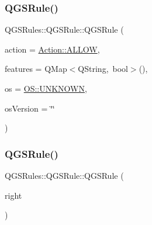 \subsubsection{\texorpdfstring{Q\+G\+S\+Rule()}{QGSRule()}\hspace{0.1cm}{\footnotesize\ttfamily [1/3]}}
{\footnotesize\ttfamily Q\+G\+S\+Rules\+::\+Q\+G\+S\+Rule\+::\+Q\+G\+S\+Rule (\begin{DoxyParamCaption}\item[{const Q\+String \&}]{action = {\ttfamily \mbox{\hyperlink{namespace_action_a019c221c4527d6eeea3ce813d6b495f4}{Action\+::\+A\+L\+L\+OW}}},  }\item[{const Q\+Map$<$ Q\+String, bool $>$ \&}]{features = {\ttfamily QMap$<$QString,~bool$>$()},  }\item[{const Q\+String \&}]{os = {\ttfamily \mbox{\hyperlink{namespace_o_s_a03d369686c450602db02bac63d973c99}{O\+S\+::\+U\+N\+K\+N\+O\+WN}}},  }\item[{const Q\+String \&}]{os\+Version = {\ttfamily \char`\"{}\char`\"{}} }\end{DoxyParamCaption})}

\mbox{\label{class_q_g_s_rules_1_1_q_g_s_rule_a4aa6410771bf449727119a9337c389ae}} 
\subsubsection{\texorpdfstring{Q\+G\+S\+Rule()}{QGSRule()}\hspace{0.1cm}{\footnotesize\ttfamily [2/3]}}
{\footnotesize\ttfamily Q\+G\+S\+Rules\+::\+Q\+G\+S\+Rule\+::\+Q\+G\+S\+Rule (\begin{DoxyParamCaption}\item[{const \mbox{\hyperlink{class_q_g_s_rules_1_1_q_g_s_rule}{Q\+G\+S\+Rule}} \&}]{right }\end{DoxyParamCaption})\hspace{0.3cm}{\ttfamily [default]}}

\mbox{\label{class_q_g_s_rules_1_1_q_g_s_rule_a3f785b08b63dedf3354ef33b393e3a71}} 
